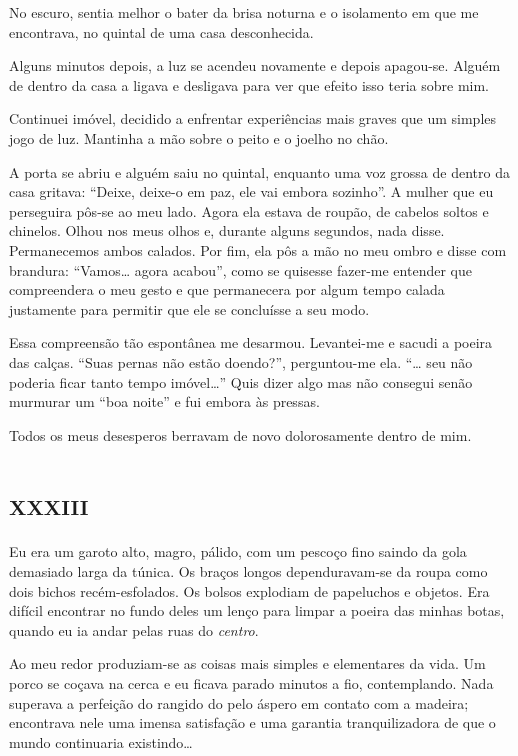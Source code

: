 No escuro, sentia melhor o bater da brisa noturna e o isolamento em que me encontrava, no quintal de uma casa desconhecida.

Alguns minutos depois, a luz se acendeu novamente e depois apagou-se. Alguém de dentro da casa a ligava e desligava para ver que efeito isso teria sobre mim.

Continuei imóvel, decidido a enfrentar experiências mais graves que um simples jogo de luz. Mantinha a mão sobre o peito e o joelho no chão.

A porta se abriu e alguém saiu no quintal, enquanto uma voz grossa de dentro da casa gritava: ``Deixe, deixe-o em paz, ele vai embora sozinho''. A mulher que eu perseguira pôs-se ao meu lado. Agora ela estava de roupão, de cabelos soltos e chinelos. Olhou nos meus olhos e, durante alguns segundos, nada disse. Permanecemos ambos calados. Por fim, ela pôs a mão no meu ombro e disse com brandura: ``Vamos\ldots{} agora acabou'', como se quisesse fazer-me entender que compreendera o meu gesto e que permanecera por algum tempo calada justamente para permitir que ele se concluísse a seu modo.

Essa compreensão tão espontânea me desarmou. Levantei-me e sacudi a poeira das calças. ``Suas pernas não estão doendo?'', perguntou-me ela. ``\ldots{} seu não poderia ficar tanto tempo imóvel\ldots{}'' Quis dizer algo mas não consegui senão murmurar um ``boa noite'' e fui embora às pressas.

Todos os meus desesperos berravam de novo dolorosamente dentro de mim.


\chapter*{\huge\centering\textsc{xxxiii}}

Eu era um garoto alto, magro, pálido, com um pescoço fino saindo da gola demasiado larga da túnica. Os braços longos dependuravam-se da roupa como dois bichos recém-esfolados. Os bolsos explodiam de papeluchos e objetos. Era difícil encontrar no fundo deles um lenço para limpar a poeira das minhas botas, quando eu ia andar pelas ruas do \textit{centro}.

Ao meu redor produziam-se as coisas mais simples e elementares da vida. Um porco se coçava na cerca e eu ficava parado minutos a fio, contemplando. Nada superava a perfeição do rangido do pelo áspero em contato com a madeira; encontrava nele uma imensa satisfação e uma garantia tranquilizadora de que o mundo continuaria existindo\ldots{}

